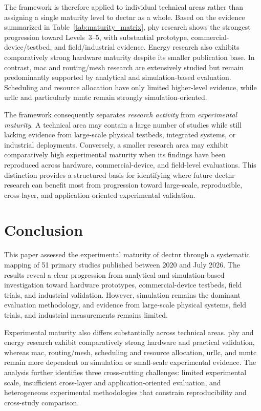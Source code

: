 \documentclass[conference]{IEEEtran}
\begin{document}
The framework is therefore applied to individual technical areas
rather than assigning a single maturity level to \gls{dectnr} as a
whole. Based on the evidence summarized in
Table~\ref{tab:maturity_matrix}, \gls{phy} research shows the strongest
progression toward Levels~3--5, with substantial prototype,
commercial-device/testbed, and field/industrial evidence. Energy
research also exhibits comparatively strong hardware maturity despite
its smaller publication base. In contrast, \gls{mac} and routing/mesh
research are extensively studied but remain predominantly supported by
analytical and simulation-based evaluation. Scheduling and resource
allocation have only limited higher-level evidence, while
\gls{urllc} and particularly \gls{mmtc} remain strongly
simulation-oriented.

The framework consequently separates \emph{research activity} from
\emph{experimental maturity}. A technical area may contain a large
number of studies while still lacking evidence from large-scale
physical testbeds, integrated systems, or industrial deployments.
Conversely, a smaller research area may exhibit comparatively high
experimental maturity when its findings have been reproduced across
hardware, commercial-device, and field-level evaluations. This
distinction provides a structured basis for identifying where future
\gls{dectnr} research can benefit most from progression toward
large-scale, reproducible, cross-layer, and application-oriented
experimental validation.

\section{Conclusion}
\label{sec:conclusion}

This paper assessed the experimental maturity of \gls{dectnr} through
a systematic mapping of 51 primary studies published between 2020 and
July 2026. The results reveal a clear progression from analytical and
simulation-based investigation toward hardware prototypes,
commercial-device testbeds, field trials, and industrial validation.
However, simulation remains the dominant evaluation methodology, and
evidence from large-scale physical systems, field trials, and
industrial measurements remains limited.

Experimental maturity also differs substantially across technical
areas. \gls{phy} and energy research exhibit comparatively strong
hardware and practical validation, whereas \gls{mac}, routing/mesh,
scheduling and resource allocation, \gls{urllc}, and \gls{mmtc}
remain more dependent on simulation or small-scale experimental
evidence. The analysis further identifies three cross-cutting
challenges: limited experimental scale, insufficient cross-layer and
application-oriented evaluation, and heterogeneous experimental
methodologies that constrain reproducibility and cross-study
comparison.
\end{document}
